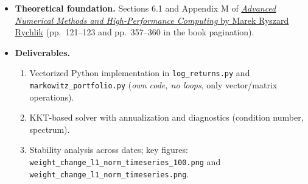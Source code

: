 \documentclass[11pt]{article}
\begin{document}
\begin{itemize}
\begin{itemize}
			\item \textit{Problem statement in this report.} The purpose of this project is to test using real,  observational data on stocks, whether the Markowitz portfolio selection is stable to small perturbations or from day-to-day variations, following the objections raised in the references above.
			\item \textit{Why this matters.} Practitioners (and clients) expect continuity: when market conditions change little from “yesterday” to “today,” the recommended portfolio \(w_t\) should remain close to \(w_{t-1}\). Large, frequent swings undermine practical usability.
			\item \textit{What we test and how.} We deliberately make the benchmark \emph{favorable} to the baseline: choose \(200\) of the most stable, weakly correlated equities (no cherry-picking of ``difficult'' names), vary inputs only by \emph{natural} day-over-day updates of \((\mu,\Sigma)\) (no artificial noise), and measure stability by
			\[
			\tau_t=\frac{\lVert w_t-w_{t-1}\rVert_{l^1}}{\lVert w_{t-1}\rVert_{l^1}}\times 100\%,\qquad
			\kappa=\text{cond}(\cdot).
			\]
			\item \textit{Intended contribution.} The economics literature frequently \emph{states} instability for empirical mean--variance solutions, but {\bf clear \emph{quantitative} demonstrations of the magnitude of day-to-day swings are rare (to be honest I did not find a numerical estimate)}. This report fills that gap with explicit figures and summary statistics on real data, and sets up the subsequent RPCA/RMT-based improvements.
		\end{itemize}
		\item \textbf{Theoretical foundation.} Sections 6.1 and Appendix M of \href{numbook.pdf}{\emph{Advanced Numerical Methods and High-Performance Computing} by Marek Ryszard Rychlik} (pp.~121--123 and pp.~357--360 in the book pagination).
		\item \textbf{Deliverables.}
		\begin{enumerate}
			\item Vectorized Python implementation in \texttt{log\_returns.py} and \texttt{markowitz\_portfolio.py} (\emph{own code, no loops}, only vector/matrix operations).
			\item KKT-based solver with annualization and diagnostics (condition number, spectrum).
			\item Stability analysis across dates; key figures: \texttt{weight\_change\_l1\_norm\_timeseries\_100.png} and \texttt{weight\_change\_l1\_norm\_timeseries.png}.
		\end{enumerate}
	\end{itemize}
	
\end{document}
